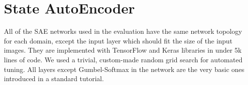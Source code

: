 \documentclass[11pt]{article}
\begin{document}
\begin{comment}



Finally, \emph{our conceptual contribution is the first demonstration that it is
possible to leverage deep learning quite effectively for classical planning,
which ``has been central to AI research since its inception.''} \cite{russell1995artificial}
\end{comment}

\clearpage
\appendix

\section{State AutoEncoder}

\label{sec:SAE-detail}

All of the SAE networks used in the evaluation have the same network
topology for each domain, except the input layer which should fit the size of the input
images. They are implemented with TensorFlow and Keras libraries in under
5k lines of code.
We used a trivial, custom-made random grid search for automated tuning.
All layers except Gumbel-Softmax in the network are the very basic ones introduced in a standard tutorial.
\end{document}
